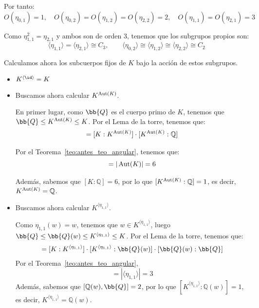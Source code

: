 \begin{ejemplo}
    Por tanto:
    \begin{equation*}
        O(\eta_{0,1}) = 1, \quad O(\eta_{0,2}) = O(\eta_{1,2}) = O(\eta_{2,2}) = 2, \quad O(\eta_{1,1}) = O(\eta_{2,1}) = 3
    \end{equation*}

    Como $\eta_{1,1}^2 = \eta_{2,1}$ y ambos son de orden 3, tenemos que los subgrupos propios son:
    \begin{equation*}
        \langle \eta_{1,1} \rangle  = \langle \eta_{2,1} \rangle \cong C_3, \qquad \langle \eta_{0,2} \rangle  \cong \langle \eta_{1,2} \rangle  \cong \langle \eta_{2,2} \rangle \cong C_2
    \end{equation*}

    Calculamos ahora los subcuerpos fijos de $K$ bajo la acción de estos subgrupos. \begin{itemize}
        \item $K^{\langle \id \rangle } = K$
        \item Buscamos ahora calcular $K^{\operatorname{Aut}(K)}$.
        
        En primer lugar, como $\bb{Q}$ es el cuerpo primo de $K$, tenemos que $\bb{Q}\leq K^{\Aut(K)}\leq K$. Por el Lema de la torre, tenemos que:
        \begin{equation*}
            [K:\mathbb{Q}] = [K:K^{\Aut(K)}]\cdot [K^{\Aut(K)}:\mathbb{Q}]
        \end{equation*}
        
        Por el Teorema~\ref{teo:antes_teo_angular}, tenemos que:
        \begin{equation*}
            [K:K^{\Aut(K)}] = |\Aut(K)| = 6
        \end{equation*}

        Además, sabemos que $[K:\mathbb{Q}] = 6$, por lo que $[K^{\operatorname{Aut}(K)}:\mathbb{Q}] = 1$, es decir, $K^{\operatorname{Aut}(K)} = \mathbb{Q}$.

        \item Buscamos ahora calcular $K^{\langle \eta_{1,1} \rangle }$.
        
        Como $\eta_{1,1}(w) = w$, tenemos que $w\in K^{\langle \eta_{1,1} \rangle }$, luego $\bb{Q}\leq \bb{Q}(w)\leq K^{\langle \eta_{1,1} \rangle }\leq K$. Por el Lema de la torre, tenemos que:
        \begin{equation*}
            [K:\bb{Q}] = [K:K^{\langle \eta_{1,1} \rangle }]\cdot [K^{\langle \eta_{1,1} \rangle }:\bb{Q}(w)]\cdot [\bb{Q}(w):\bb{Q}]
        \end{equation*}
        Por el Teorema~\ref{teo:antes_teo_angular},
        \begin{equation*}
            [K:K^{\langle \eta_{1,1} \rangle }] = |\langle \eta_{1,1} \rangle | = 3
        \end{equation*}
        Además, sabemos que $[\mathbb{Q}(w), \bb{Q}] = 2$, por lo que $[K^{\langle \eta_{1,1} \rangle }:\mathbb{Q}(w)] = 1$, es decir, $K^{\langle \eta_{1,1} \rangle } = \mathbb{Q}(w)$.


\end{itemize}
\end{ejemplo}
